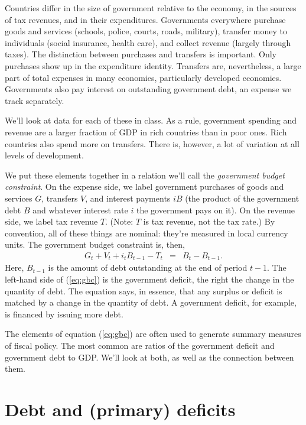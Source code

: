 Countries differ in the size of government relative to the economy,
in the sources of tax revenues,
and in their expenditures.
Governments everywhere
purchase goods and services (schools, police, courts, roads, military),
transfer money to individuals (social insurance, health care),
and collect revenue (largely through taxes).
The distinction between purchases and transfers is important.
Only purchases show up in the expenditure identity.
Transfers are, nevertheless, a large part of total expenses in many economies,
particularly developed economies.
Governments also pay interest on outstanding government debt,
an expense we track separately.

We'll look at data for each of these in class.
As a rule, government spending and revenue are a larger fraction of GDP
in rich countries than in poor ones.
Rich countries also spend more on transfers.
There is, however, a lot of variation at all levels of development.

We put these elements together in a relation we'll call
the {\it government budget constraint\/}.
On the expense side, we label government purchases of goods and services $G$,
transfers $V$, and interest payments $iB$
(the product of the government debt $B$ and whatever interest rate $i$
the government pays on it).
On the revenue side, we label tax revenue $T$.
(Note: $T$ is tax revenue, not the tax rate.)
By convention, all of these things are nominal:
they're measured in local currency units.
The government budget constraint is, then,
\begin{eqnarray}
    G_t + V_t + i_t B_{t-1} - T_t  &=& B_{t} - B_{t-1} .
    \label{eq:gbc}
\end{eqnarray}
Here, $B_{t-1}$ is the amount of debt outstanding at the end of
period $t-1$.
The left-hand side of (\ref{eq:gbc})
is the government deficit,
the right the change in the quantity of debt.
The equation says, in essence, that any surplus or deficit is matched
by a change in the quantity of debt.
A government deficit, for example, is financed by issuing more debt.


The elements of equation (\ref{eq:gbc})
are often used to generate summary measures
of fiscal policy.
The most common are ratios  of
the government deficit and government debt to GDP.
We'll look at both, as well as the connection between them.


%
\section{Debt and (primary) deficits}


